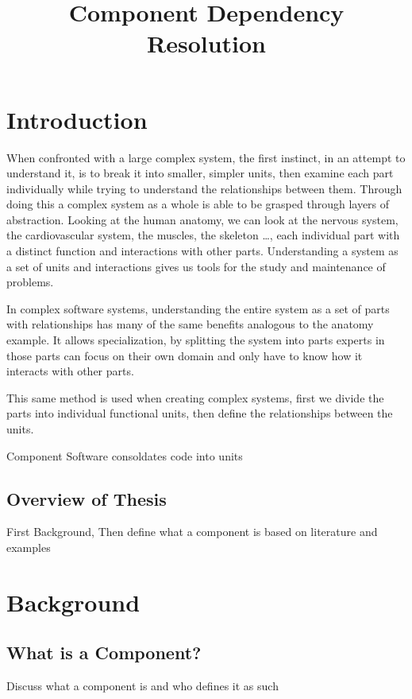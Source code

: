 \documentclass{report}
\title{Component Dependency Resolution}
\begin{document}
\chapter{Introduction}

When confronted with a large complex system, the first instinct, in an attempt to understand it, is to break it into smaller, simpler units, 
then examine each part individually while trying to understand the relationships between them.
Through doing this a complex system as a whole is able to be grasped through layers of abstraction.
Looking at the human anatomy, we can look at the nervous system, the cardiovascular system, the muscles, the skeleton \ldots,
each individual part with a distinct function and interactions with other parts.
Understanding a system as a set of units and interactions gives us tools for the study and maintenance of problems.  

In complex software systems, understanding the entire system as a set of parts with relationships has many of the same benefits analogous to the anatomy example.
It allows specialization, 
by splitting the system into parts experts in those parts can focus on their own domain and only have to know how it interacts with other parts.

This same method is used when creating complex systems, first we divide the parts into individual functional units,
then define the relationships between the units.


Component Software consoldates code into units


\section{Overview of Thesis}
First Background,
Then define what a component is based on literature and examples

\chapter{Background}

\section{What is a Component?}
Discuss what a component is and who defines it as such
\end{document}
